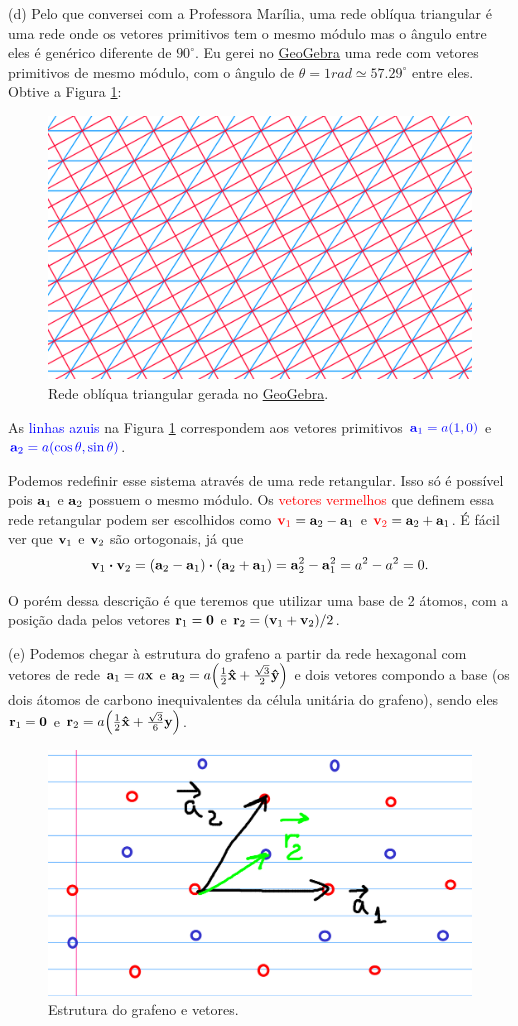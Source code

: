 \documentclass[a4paper,10pt]{article}
\begin{document}
\pagebreak

(d) Pelo que conversei com a Professora Marília, uma rede oblíqua triangular é uma rede onde os vetores primitivos tem o mesmo módulo mas o ângulo entre eles é genérico diferente de $90^\circ$. Eu gerei no \href{https://www.geogebra.org/geometry}{GeoGebra} uma rede com vetores primitivos de mesmo módulo, com o ângulo de $\theta = 1 \unit{rad} \simeq 57.29^\circ$ entre eles. Obtive a Figura \ref{fig:obliq_triang}:
\begin{figure}[H]
\centering
\includegraphics[width=0.7\linewidth]{fig/obliq_triang.png}
\caption{Rede oblíqua triangular gerada no \href{https://www.geogebra.org/geometry}{GeoGebra}.}
\label{fig:obliq_triang}
\end{figure}

As \textcolor{blue}{linhas azuis} na Figura \ref{fig:obliq_triang} correspondem aos vetores primitivos $\textcolor{blue}{\vb{a}_1 = a(1,0)}$ e $\textcolor{blue}{\vb{a}_2 = a(\cos\theta,\sin\theta)}$.

Podemos redefinir esse sistema através de uma rede retangular. Isso só é possível pois $\vb{a}_1$ e $\vb{a}_2$ possuem o mesmo módulo. Os \textcolor{red}{vetores vermelhos} que definem essa rede retangular podem ser escolhidos como $\textcolor{red}{\vb{v}_1} = \vb{a}_2 - \vb{a}_1$ e $\textcolor{red}{\vb{v}_2} = \vb{a}_2 + \vb{a}_1$. É fácil ver que $\vb{v}_1$ e $\vb{v}_2$ são ortogonais, já que
$$
\v_1 \vdot \v_2 = (\a_2 - \a_1) \vdot (\a_2 + \a_1) = \a_2^2 - \a_1^2 = a^2 - a^2 = 0.
$$

O porém dessa descrição é que teremos que utilizar uma base de 2 átomos, com a posição dada pelos vetores $\vb{r}_1 = \vb{0}$ e $\vb{r}_2 = (\vb{v}_1 + \vb{v}_2)/2$.

\n

(e) Podemos chegar à estrutura do grafeno a partir da rede hexagonal com vetores de rede $\vb{a}_1 = a \vb{x}$ e $\vb{a}_2 = a \qty(\frac{1}{2} \vu{x} + \frac{\sqrt{3}}{2} \vu{y})$ e dois vetores compondo a base (os dois átomos de carbono inequivalentes da célula unitária do grafeno), sendo eles $\vb{r}_1 = \vb{0}$ e $\vb{r}_2 = a \qty(\frac{1}{2}\vu{x} + \frac{\sqrt{3}}{6}\vb{y})$.
\begin{figure}[H]
\centering
\includegraphics[width=0.4\linewidth]{fig/graphene_vec}
\caption{Estrutura do grafeno e vetores.}
\label{fig:graphene_vec}
\end{figure}
\end{document}
